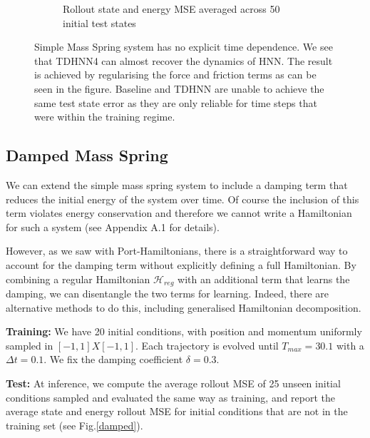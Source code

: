 \documentclass[twoside]{article}
\begin{document}
\begin{figure}[h!]
\begin{subfigure}[b]{0.48\textwidth}
		\caption{Rollout state and energy MSE averaged across 50 initial test states}
	\end{subfigure}
\caption{Simple Mass Spring system has no explicit time dependence. We see that TDHNN4 can almost recover the dynamics of HNN. The result is achieved by regularising the force and friction terms as can be seen in the figure. Baseline and TDHNN are unable to achieve the same test state error as they are only reliable for time steps that were within the training regime.}
	\label{mspring}
\end{figure}


\subsection{Damped Mass Spring}

We can extend the simple mass spring system to include a damping term that reduces the initial energy of the system over time. Of course the inclusion of this term violates energy conservation and therefore we cannot write a Hamiltonian for such a system (see Appendix A.1 for details). 

However, as we saw with Port-Hamiltonians, there is a straightforward way to account for the damping term without explicitly defining a full Hamiltonian. By combining a regular Hamiltonian $\mathcal{H}_{reg}$ with an additional term that learns the damping, we can disentangle the two terms for learning. Indeed, there are alternative methods to do this, including generalised Hamiltonian decomposition.

\textbf{Training:} We have 20 initial conditions, with position and momentum uniformly sampled in $[-1,1]X[-1,1]$. Each trajectory is evolved until $T_{max} = 30.1$ with a $\Delta t = 0.1$. We fix the damping coefficient $\delta = 0.3$.

\textbf{Test:} At inference, we compute the average rollout MSE of 25 unseen initial conditions sampled and evaluated the same way as training, and report the average state and energy rollout MSE for initial conditions that are not in the training set (see Fig.\ref{damped}).
\end{document}
